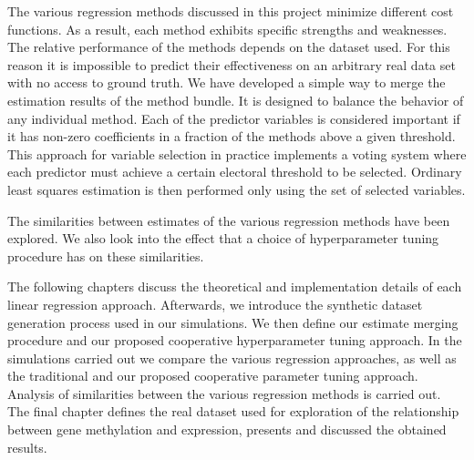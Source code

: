 The various regression methods discussed in this project minimize different cost functions. As a result, each method exhibits specific strengths and weaknesses. The relative performance of the methods depends on the dataset used. For this reason it is impossible to predict their effectiveness on an arbitrary real data set with no access to ground truth. We have developed a simple way to merge the estimation results of the method bundle. It is designed to balance the behavior of any individual method. Each of the predictor variables is considered important if it has non-zero coefficients in a fraction of the methods above a given threshold. This approach for variable selection in practice implements a voting system where each predictor must achieve a certain electoral threshold to be selected. Ordinary least squares estimation is then performed only using the set of selected variables.

The similarities between estimates of the various regression methods have been explored. We also look into the effect that a choice of hyperparameter tuning procedure has on these similarities.

The following chapters discuss the theoretical and implementation details of each linear regression approach. Afterwards, we introduce the synthetic dataset generation process used in our simulations. We then define our estimate merging procedure and our proposed cooperative hyperparameter tuning approach. In the simulations carried out we compare the various regression approaches, as well as the traditional and our proposed cooperative parameter tuning approach. Analysis of similarities between the various regression methods is carried out. The final chapter defines the real dataset used for exploration of the relationship between gene methylation and expression, presents and discussed the obtained results.
